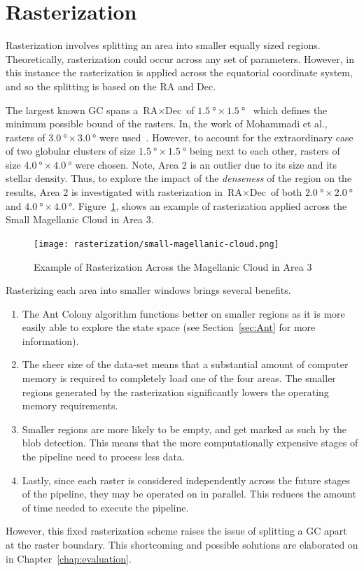 \section{\label{sec:rasterization}Rasterization}

Rasterization involves splitting an area into
smaller equally sized regions. Theoretically, rasterization could occur
across any set of parameters. However, in this instance the rasterization is
applied across the equatorial coordinate system, and so the splitting is based
on the RA and Dec.

The largest known GC spans a $\text{RA}\times\text{Dec}$ of
$\SI{1.5}{\degree}\times\SI{1.5}{\degree}$~\cite{listGC} which defines the minimum
possible bound of the rasters. In, the work of Mohammadi et al., rasters of
$\SI{3.0}{\degree}\times\SI{3.0}{\degree}$ were used~\cite{Mohammadi}. However, to
account for the extraordinary case of two globular clusters of size
$\SI{1.5}{\degree}\times\SI{1.5}{\degree}$ being next to each other, rasters of size
$\SI{4.0}{\degree}\times\SI{4.0}{\degree}$ were chosen. Note, Area 2 is an outlier
due to its size and its stellar density. Thus, to explore the impact of the
\textit{denseness} of the region on the results, Area 2 is investigated with
rasterization in $\text{RA}\times\text{Dec}$ of both $\SI{2.0}{\degree}\times\SI{2.0}{\degree}$ and
$\SI{4.0}{\degree}\times\SI{4.0}{\degree}$. Figure~\ref{fig:rasterization-example}, shows an example
of rasterization applied across the Small Magellanic Cloud in Area 3.
\begin{figure}[H]
    \centering
    \texttt{[image: rasterization/small-magellanic-cloud.png]}
    \caption{\label{fig:rasterization-example} Example of Rasterization Across the Magellanic Cloud in Area 3}
\end{figure}
\vspace{-1.5em}
\noindent Rasterizing each area into smaller windows brings several benefits.
\begin{enumerate}
    \item The Ant Colony algorithm functions better on smaller regions as it is
          more easily able to explore the state space (see Section~\ref{sec:Ant} for more information).
    \item The sheer size of the data-set means that a substantial amount of
          computer memory is required to completely load one of the four areas. The
          smaller regions generated by the rasterization significantly lowers the operating memory
          requirements.
    \item Smaller regions are more likely to be empty, and get marked
          as such by the blob detection. This means that the more computationally expensive
          stages of the pipeline need to process less data.
    \item Lastly, since each raster is considered independently across the
          future stages of the pipeline, they may be operated on in parallel. This
          reduces the amount of time needed to execute the pipeline.
\end{enumerate}
However, this fixed rasterization scheme raises the issue of splitting a GC
apart at the raster boundary. This shortcoming and possible solutions are
elaborated on in Chapter~\ref{chap:evaluation}.
\newpage{}
